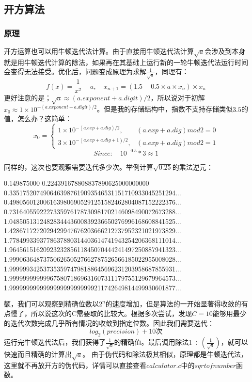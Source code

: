 \documentclass[11pt]{article}
\begin{document}
\subsection{开方算法}
\subsubsection{原理}
开方运算也可以用牛顿迭代法计算。由于直接用牛顿迭代法计算$\sqrt{a}$会涉及到本身就是用牛顿迭代计算的除法，如果再在其基础上运行新的一轮牛顿迭代法运行时间会变得无法接受。优化后，问题变成原理为求解$\frac{1}{\sqrt{a}}$，同理有：
$$
f(x)=\frac{1}{x^2}-a,\quad x_{n+1} = (1.5  -0.5\times a\times x_n)\times x_n
$$
更好注意的是；$\sqrt{a} \approx (a.exponent + a.digit)/2$，所以说对于初解$x_0 \approx 1\times 10^{-(a.exponent + a.digit)/2}$。但是我的存储结构中，指数不支持存储类似$3.5$的值，怎么办？这简单：
    \[
x_0 =
\begin{cases}
1\times 10^{-(a.exp + a.dig)/2}, & (a.exp + a.dig) mod2=0  \\ 
3\times 10^{-(a.exp + a.dig+1)/2}, &  (a.exp + a.dig) mod2=1
\end{cases}
\]
$$ Since:\quad10^{-0.5} * 3 \approx 1$$


同样的，这次也要观察需要迭代多少次。举例计算$\sqrt{0.25}$的乘法逆元：
\begin{commandline}
    0.149875000
    0.224391678808837890625000000000
    0.3351752074906463987619093546531151710933045251294...
    0.4980560120061639806905291251582462804087152222376...
    0.7316405592227335976178730981702146098490072673288...
    1.0485051312482834443600839236650276996168608841525...
    1.4286717272029429947676203666212737952321021973829...
    1.7784993393778637880314403614741943254206368111014...
    1.9645615162092323285611845070444241497250887941323...
    1.9990636487375062650527662787526566185022955008028...
    1.9999993425373535974798188645696231203958687855931...
    1.9999999999996758071869631607311179755129679964573...
    1.9999999999999999999999999211742649814499930601877...
\end{commandline}
额，我们可以观察到精确位数以$2^n$的速度增加，但是算法的一开始显著得收敛的有点慢了，所以说这次的C需要取的比较大。根据多次尝试，发现$C=10$能够用最少的迭代次数完成几乎所有情况的收敛到指定位数。因此我们需要迭代：
$$log_2(precision) + 10 \text{次}$$
运行完牛顿迭代法后，我们获得了$\frac{1}{\sqrt{a}}$的精确值。最后调用除法$1 \div (\frac{1}{\sqrt{a}})$，就可以快速而且精确的计算出$\sqrt{a}$。
由于伪代码和除法极其相似，原理都是牛顿迭代法，这里就不再放开方的伪代码，详情可以直接查看$calculator.c$中的$sqrtofnumber$函数。
\end{document}
